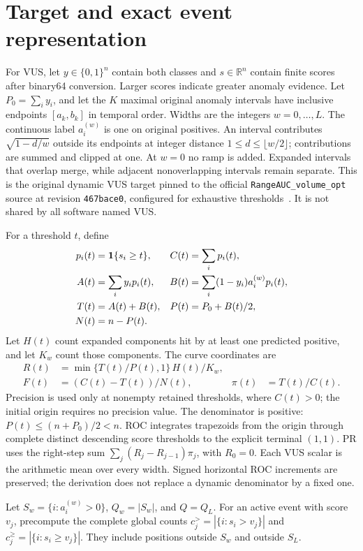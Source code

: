 \section{Target and exact event representation}
For VUS, let $y\in\{0,1\}^n$ contain both classes and $s\in\mathbb{R}^n$ contain finite
scores after binary64 conversion. Larger scores indicate greater anomaly
evidence. Let $P_0=\sum_i y_i$, and let the $K$ maximal original anomaly
intervals have inclusive endpoints $[a_k,b_k]$ in temporal order. Widths are
the integers $w=0,\ldots,L$. The continuous label $a_i^{(w)}$ is one on
original positives. An interval contributes $\sqrt{1-d/w}$ outside its
endpoints at integer distance $1\le d\le\lfloor w/2\rfloor$; contributions
are summed and clipped at one. At $w=0$ no ramp is added. Expanded intervals
that overlap merge, while adjacent nonoverlapping intervals remain separate.
This is the original dynamic VUS target pinned to the official
\texttt{RangeAUC\_volume\_opt} source at revision
\texttt{467bace0}, configured for exhaustive thresholds~\cite{vusreference}.
It is not shared by all software named VUS.

For a threshold $t$, define
\begin{align}
 p_i(t)&=\mathbf{1}\{s_i\ge t\}, & C(t)&=\sum_i p_i(t),\\
 A(t)&=\sum_i y_i p_i(t), &
 B(t)&=\sum_i(1-y_i)a_i^{(w)}p_i(t),\\
 T(t)&=A(t)+B(t), & P(t)&=P_0+B(t)/2,\\
 N(t)&=n-P(t).
\end{align}
Let $H(t)$ count expanded components hit by at least one predicted positive,
and let $K_w$ count those components. The curve coordinates are
\begin{align}
 R(t)&=\min\{T(t)/P(t),1\}\,H(t)/K_w,\\
 F(t)&=(C(t)-T(t))/N(t), & \pi(t)&=T(t)/C(t).
\end{align}
Precision is used only at nonempty retained thresholds, where $C(t)>0$;
the initial origin requires no precision value.
The denominator is positive: $P(t)\le(n+P_0)/2<n$. ROC integrates trapezoids
from the origin through complete distinct descending score thresholds to
the explicit terminal $(1,1)$. PR uses the right-step sum
$\sum_j(R_j-R_{j-1})\pi_j$, with $R_0=0$. Each VUS scalar is the arithmetic
mean over every width. Signed horizontal ROC increments are preserved; the
derivation does not replace a dynamic denominator by a fixed one.

Let $S_w=\{i:a_i^{(w)}>0\}$, $Q_w=|S_w|$, and $Q=Q_L$. For an active event
with score $v_j$, precompute the complete global counts
$c_j^>=|\{i:s_i>v_j\}|$ and $c_j^\ge=|\{i:s_i\ge v_j\}|$. They include
positions outside $S_w$ and outside $S_L$.

